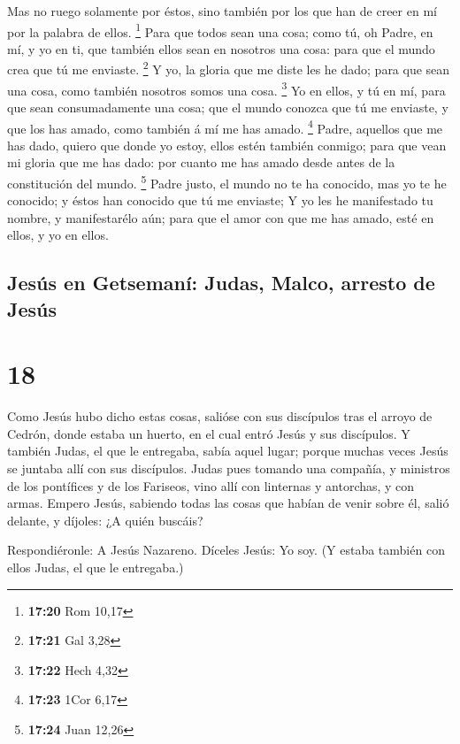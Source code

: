  Mas no ruego solamente por éstos, sino también por los que
han de creer en mí por la palabra de ellos. \footnote{\textbf{17:20} Rom
  10,17}  Para que todos sean una cosa; como tú, oh Padre,
en mí, y yo en ti, que también ellos sean en nosotros una cosa: para que
el mundo crea que tú me enviaste. \footnote{\textbf{17:21} Gal 3,28}
 Y yo, la gloria que me diste les he dado; para que sean
una cosa, como también nosotros somos una cosa. \footnote{\textbf{17:22}
  Hech 4,32}  Yo en ellos, y tú en mí, para que sean
consumadamente una cosa; que el mundo conozca que tú me enviaste, y que
los has amado, como también á mí me has amado. \footnote{\textbf{17:23}
  1Cor 6,17}  Padre, aquellos que me has dado, quiero que
donde yo estoy, ellos estén también conmigo; para que vean mi gloria que
me has dado: por cuanto me has amado desde antes de la constitución del
mundo. \footnote{\textbf{17:24} Juan 12,26}  Padre justo,
el mundo no te ha conocido, mas yo te he conocido; y éstos han conocido
que tú me enviaste;  Y yo les he manifestado tu nombre, y
manifestarélo aún; para que el amor con que me has amado, esté en ellos,
y yo en ellos.

\hypertarget{jesuxfas-en-getsemanuxed-judas-malco-arresto-de-jesuxfas}{%
\subsection{Jesús en Getsemaní: Judas, Malco, arresto de
Jesús}\label{jesuxfas-en-getsemanuxed-judas-malco-arresto-de-jesuxfas}}

\hypertarget{section-17}{%
\section{18}\label{section-17}}

 Como Jesús hubo dicho estas cosas, salióse con sus
discípulos tras el arroyo de Cedrón, donde estaba un huerto, en el cual
entró Jesús y sus discípulos.  Y también Judas, el que le
entregaba, sabía aquel lugar; porque muchas veces Jesús se juntaba allí
con sus discípulos.  Judas pues tomando una compañía, y
ministros de los pontífices y de los Fariseos, vino allí con linternas y
antorchas, y con armas.  Empero Jesús, sabiendo todas las
cosas que habían de venir sobre él, salió delante, y díjoles: ¿A quién
buscáis?

 Respondiéronle: A Jesús Nazareno. Díceles Jesús: Yo soy. (Y
estaba también con ellos Judas, el que le entregaba.)

